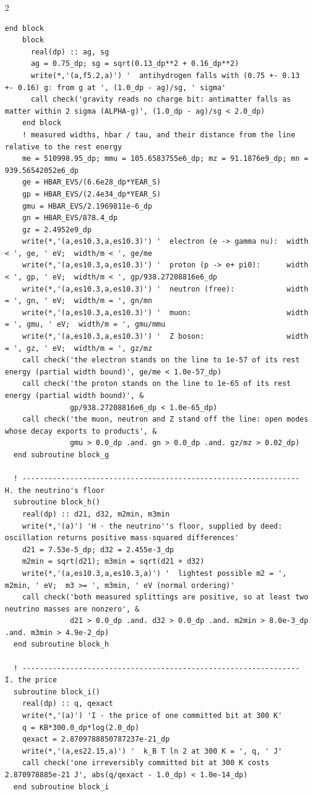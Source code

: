 \documentclass[10pt]{article}
\begin{document}
\begin{multicols}{2}
\begin{Verbatim}[fontsize=\fontsize{6.2}{7.2}\selectfont,breaklines,breakanywhere,breaksymbolleft={}]
    end block
    block
      real(dp) :: ag, sg
      ag = 0.75_dp; sg = sqrt(0.13_dp**2 + 0.16_dp**2)
      write(*,'(a,f5.2,a)') '  antihydrogen falls with (0.75 +- 0.13 +- 0.16) g: from g at ', (1.0_dp - ag)/sg, ' sigma'
      call check('gravity reads no charge bit: antimatter falls as matter within 2 sigma (ALPHA-g)', (1.0_dp - ag)/sg < 2.0_dp)
    end block
    ! measured widths, hbar / tau, and their distance from the line relative to the rest energy
    me = 510998.95_dp; mmu = 105.6583755e6_dp; mz = 91.1876e9_dp; mn = 939.56542052e6_dp
    ge = HBAR_EVS/(6.6e28_dp*YEAR_S)
    gp = HBAR_EVS/(2.4e34_dp*YEAR_S)
    gmu = HBAR_EVS/2.1969811e-6_dp
    gn = HBAR_EVS/878.4_dp
    gz = 2.4952e9_dp
    write(*,'(a,es10.3,a,es10.3)') '  electron (e -> gamma nu):  width < ', ge, ' eV;  width/m < ', ge/me
    write(*,'(a,es10.3,a,es10.3)') '  proton (p -> e+ pi0):      width < ', gp, ' eV;  width/m < ', gp/938.27208816e6_dp
    write(*,'(a,es10.3,a,es10.3)') '  neutron (free):            width = ', gn, ' eV;  width/m = ', gn/mn
    write(*,'(a,es10.3,a,es10.3)') '  muon:                      width = ', gmu, ' eV;  width/m = ', gmu/mmu
    write(*,'(a,es10.3,a,es10.3)') '  Z boson:                   width = ', gz, ' eV;  width/m = ', gz/mz
    call check('the electron stands on the line to 1e-57 of its rest energy (partial width bound)', ge/me < 1.0e-57_dp)
    call check('the proton stands on the line to 1e-65 of its rest energy (partial width bound)', &
               gp/938.27208816e6_dp < 1.0e-65_dp)
    call check('the muon, neutron and Z stand off the line: open modes whose decay exports to products', &
               gmu > 0.0_dp .and. gn > 0.0_dp .and. gz/mz > 0.02_dp)
  end subroutine block_g

  ! ---------------------------------------------------------------- H. the neutrino's floor
  subroutine block_h()
    real(dp) :: d21, d32, m2min, m3min
    write(*,'(a)') 'H · the neutrino''s floor, supplied by deed: oscillation returns positive mass-squared differences'
    d21 = 7.53e-5_dp; d32 = 2.455e-3_dp
    m2min = sqrt(d21); m3min = sqrt(d21 + d32)
    write(*,'(a,es10.3,a,es10.3,a)') '  lightest possible m2 = ', m2min, ' eV;  m3 >= ', m3min, ' eV (normal ordering)'
    call check('both measured splittings are positive, so at least two neutrino masses are nonzero', &
               d21 > 0.0_dp .and. d32 > 0.0_dp .and. m2min > 8.0e-3_dp .and. m3min > 4.9e-2_dp)
  end subroutine block_h

  ! ---------------------------------------------------------------- I. the price
  subroutine block_i()
    real(dp) :: q, qexact
    write(*,'(a)') 'I · the price of one committed bit at 300 K'
    q = KB*300.0_dp*log(2.0_dp)
    qexact = 2.8709788850787237e-21_dp
    write(*,'(a,es22.15,a)') '  k_B T ln 2 at 300 K = ', q, ' J'
    call check('one irreversibly committed bit at 300 K costs 2.870978885e-21 J', abs(q/qexact - 1.0_dp) < 1.0e-14_dp)
  end subroutine block_i


\end{Verbatim}
\end{multicols}
\end{document}
